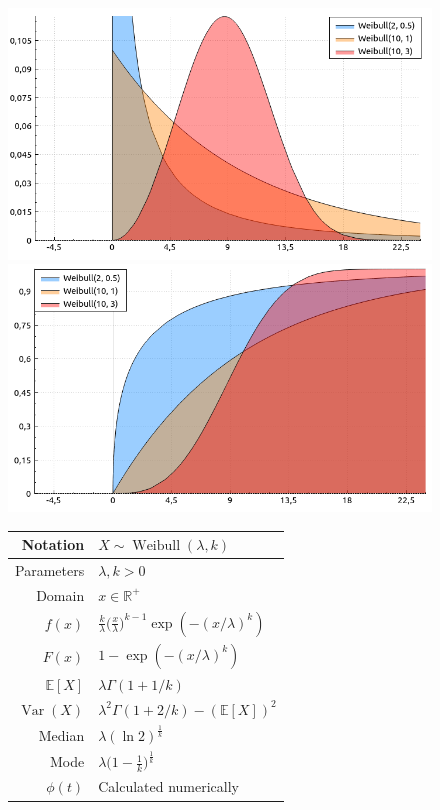 \documentclass[a4paper,11pt]{article}
\theoremstyle{plain}
\theoremstyle{definition}
\newcommand{\ME}{\mathbb{E}}
\newcommand{\MR}{\mathbb{R}}
\newcommand{\Var}{\operatorname{Var}}
\begin{document}
\begin{figure}[!htb]\centering
	\begin{minipage}{0.55\textwidth}
		\includegraphics[width=\linewidth, right]{weibull_pdf}
		\captionsetup{labelformat=empty}
		\includegraphics[width=\linewidth, right]{weibull_cdf}
		\captionsetup{labelformat=empty}
	\end{minipage}
	\begin{minipage}{0.4\textwidth}
		\begin{tabular}{| r | l |}
			\hline
			Notation & $X \sim \operatorname{Weibull}(\lambda, k)$ \\
			\hline
			Parameters & $\lambda, k > 0 $ \\
			\hline
			Domain & $x \in \MR^+$  \\
			\hline
			$f(x)$ & $ \frac{k}{\lambda}\big( \frac{x}{\lambda}\big)^{k-1} \exp(-(x/\lambda)^k)  $ \\
			\hline
			$F(x)$ & $ 1-\exp(-(x/\lambda)^k) $ \\
			\hline
			$\ME[X]$ & $ \lambda \Gamma(1+1/k)$ \\
			\hline
			$\Var(X)$ & $\lambda^2 \Gamma(1+2/k) - (\ME[X])^2$ \\
			\hline
			Median & $\lambda (\ln2)^{\frac{1}{k}}$ \\
			\hline
			Mode & $\lambda \big( 1-\frac{1}{k} \big)^{\frac{1}{k}}$ \\
			\hline
			$\phi(t)$ & Calculated numerically \\
			\hline
		\end{tabular}
	\end{minipage}
\end{figure}
\end{document}
